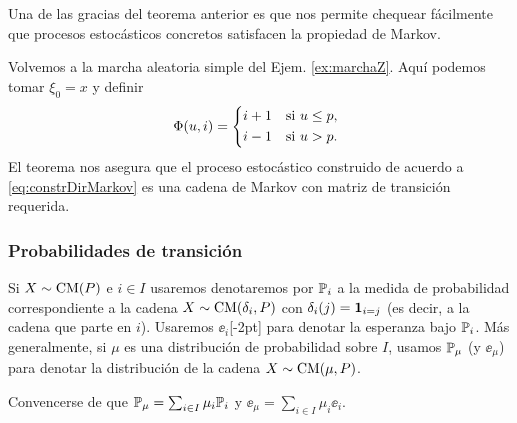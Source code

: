 Una de las gracias del teorema anterior es que nos permite chequear fácilmente que procesos estocásticos concretos satisfacen la propiedad de Markov.

\begin{ex}
Volvemos a la marcha aleatoria simple del Ejem. \ref{ex:marchaZ}.
Aquí podemos tomar $\xi_0=x$ y definir
\[\Phi(u,i)=\begin{dcases*}
i+1 & si $u\leq p$,\\
i-1 & si $u>p$.
\end{dcases*}\]
El teorema nos asegura que el proceso estocástico construido de acuerdo a \eqref{eq:constrDirMarkov} es una cadena de Markov con matriz de transición requerida.
\end{ex}

\subsubsection{Probabilidades de transición}

\begin{notation}
Si $X\sim\text{\upshape{CM}}(P)$ e $i\in I$ usaremos denotaremos por $\mathbb{P}_i$ a la medida de probabilidad correspondiente a la cadena $X\sim\text{\upshape{CM}}(\delta_i,P)$ con $\delta_i(j)=\mathbf{1}_{i=j}$ (es decir, a la cadena que parte en $i$).
Usaremos $\ee_i$[-2pt] para denotar la esperanza bajo $\mathbb{P}_i$.
\lsep
Más generalmente, si $\mu$ es una distribución de probabilidad sobre $I$, usamos $\mathbb{P}_\mu$ (y $\ee_\mu$) para denotar la distribución de la cadena $X\sim\text{\upshape{CM}}(\mu,P)$.
\end{notation}

\begin{exer}
Convencerse de que $\mathbb{P}_\mu=\sum_{i\in I}\mu_i\mathbb{P}_i$ y $\ee_\mu=\sum_{i\in I}\mu_i\ee_i$.
\end{exer}

